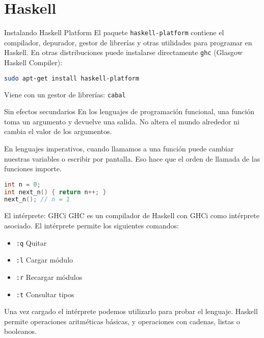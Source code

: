 \section{Haskell}

\begin{frame}[fragile]{Instalando Haskell Platform}
  El paquete \texttt{haskell-platform} contiene el compilador, depurador, gestor de
  librerías y otras utilidades para programar en Haskell.
  En otras distribuciones puede instalarse directamente \texttt{ghc}
  (Glasgow Haskell Compiler):
  \espacio

  \begin{lstlisting}[language=bash]
sudo apt-get install haskell-platform
  \end{lstlisting}
  
  Viene con un gestor de librerías: \texttt{cabal}
\end{frame}

\begin{frame}[fragile]{Sin efectos secundarios}
    En los lenguajes de programación funcional, una función toma un argumento y
    devuelve una salida. No altera el mundo alrededor ni cambia el valor de los argumentos.

    \espacio

    En lenguajes imperativos, cuando llamamos a una función puede cambiar nuestras
     variables o escribir por pantalla. Eso hace que el orden de llamada de las
    funciones importe.

    \espacio

  \begin{lstlisting}[language=C++]
int n = 0;
int next_n() { return n++; }
next_n(); // n = 1
  \end{lstlisting}
\end{frame}

\begin{frame}{El intérprete: GHCi}
  GHC es un compilador de Haskell con GHCi como intérprete asociado.
  El intérprete permite los siguientes comandos:
  \begin{itemize}
    \item \texttt{:q} \qquad  Quitar
    \item \texttt{:l} \qquad  Cargar módulo
    \item \texttt{:r} \qquad  Recargar módulos
    \item \texttt{:t} \qquad  Consultar tipos
  \end{itemize}

  Una vez cargado el intérprete podemos utilizarlo para probar el lenguaje.
  Haskell permite operaciones aritméticas básicas, y operaciones con
  cadenas, listas o booleanos.
\end{frame}

